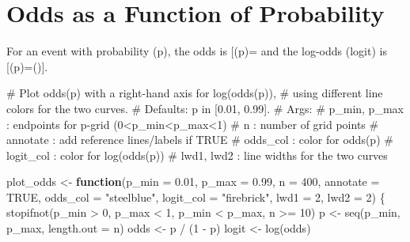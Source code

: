 \documentclass[
  letterpaper,
  DIV=11,
  numbers=noendperiod]{scrreprt}
\newenvironment{Shaded}{\begin{snugshade}}{\end{snugshade}}
\newcommand{\AttributeTok}[1]{\textcolor[rgb]{0.40,0.45,0.13}{#1}}
\newcommand{\CommentTok}[1]{\textcolor[rgb]{0.37,0.37,0.37}{#1}}
\newcommand{\ConstantTok}[1]{\textcolor[rgb]{0.56,0.35,0.01}{#1}}
\newcommand{\ControlFlowTok}[1]{\textcolor[rgb]{0.00,0.23,0.31}{\textbf{#1}}}
\newcommand{\DecValTok}[1]{\textcolor[rgb]{0.68,0.00,0.00}{#1}}
\newcommand{\FloatTok}[1]{\textcolor[rgb]{0.68,0.00,0.00}{#1}}
\newcommand{\FunctionTok}[1]{\textcolor[rgb]{0.28,0.35,0.67}{#1}}
\newcommand{\NormalTok}[1]{\textcolor[rgb]{0.00,0.23,0.31}{#1}}
\newcommand{\OtherTok}[1]{\textcolor[rgb]{0.00,0.23,0.31}{#1}}
\newcommand{\SpecialCharTok}[1]{\textcolor[rgb]{0.37,0.37,0.37}{#1}}
\newcommand{\StringTok}[1]{\textcolor[rgb]{0.13,0.47,0.30}{#1}}
\begin{document}
\section{Odds as a Function of
Probability}\label{odds-as-a-function-of-probability}

For an event with probability (p), the odds is
{[}(p)=\frac{p}{1-p}{]} and the log-odds (logit) is
{[}(p)=\log\left(\right){]}.

\begin{Shaded}
\begin{Highlighting}[]
\CommentTok{\# Plot odds(p) with a right{-}hand axis for log(odds(p)),}
\CommentTok{\# using different line colors for the two curves.}
\CommentTok{\# Defaults: p in [0.01, 0.99].}
\CommentTok{\# Args:}
\CommentTok{\#   p\_min, p\_max : endpoints for p{-}grid (0\textless{}p\_min\textless{}p\_max\textless{}1)}
\CommentTok{\#   n            : number of grid points}
\CommentTok{\#   annotate     : add reference lines/labels if TRUE}
\CommentTok{\#   odds\_col     : color for odds(p)}
\CommentTok{\#   logit\_col    : color for log(odds(p))}
\CommentTok{\#   lwd1, lwd2   : line widths for the two curves}


\NormalTok{plot\_odds }\OtherTok{\textless{}{-}} \ControlFlowTok{function}\NormalTok{(}\AttributeTok{p\_min =} \FloatTok{0.01}\NormalTok{, }\AttributeTok{p\_max =} \FloatTok{0.99}\NormalTok{, }\AttributeTok{n =} \DecValTok{400}\NormalTok{,}
                      \AttributeTok{annotate =} \ConstantTok{TRUE}\NormalTok{,}
                      \AttributeTok{odds\_col =} \StringTok{"steelblue"}\NormalTok{,}
                      \AttributeTok{logit\_col =} \StringTok{"firebrick"}\NormalTok{,}
                      \AttributeTok{lwd1 =} \DecValTok{2}\NormalTok{, }\AttributeTok{lwd2 =} \DecValTok{2}\NormalTok{) \{}
  \FunctionTok{stopifnot}\NormalTok{(p\_min }\SpecialCharTok{\textgreater{}} \DecValTok{0}\NormalTok{, p\_max }\SpecialCharTok{\textless{}} \DecValTok{1}\NormalTok{, p\_min }\SpecialCharTok{\textless{}}\NormalTok{ p\_max, n }\SpecialCharTok{\textgreater{}=} \DecValTok{10}\NormalTok{)}
\NormalTok{  p }\OtherTok{\textless{}{-}} \FunctionTok{seq}\NormalTok{(p\_min, p\_max, }\AttributeTok{length.out =}\NormalTok{ n)}
\NormalTok{  odds }\OtherTok{\textless{}{-}}\NormalTok{ p }\SpecialCharTok{/}\NormalTok{ (}\DecValTok{1} \SpecialCharTok{{-}}\NormalTok{ p)}
\NormalTok{  logit }\OtherTok{\textless{}{-}} \FunctionTok{log}\NormalTok{(odds)}


\end{Highlighting}
\end{Shaded}
\end{document}
